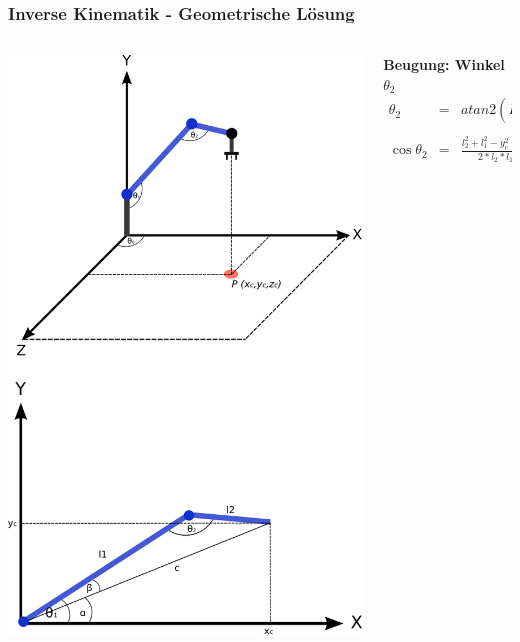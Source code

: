 \begin{frame}
\frametitle{Inverse Kinematik - Geometrische Lösung}
\begin{columns}
\begin{column}{.32\textwidth}
\includegraphics[scale=0.2]{imgs/inverseKinematik.png}
\end{column}%
\hfill
\begin{column}{.72\textwidth}
\textbf{Beugung: Winkel $\theta_2$}
\small \begin{eqnarray*}
\theta_2 &=& atan2(D, \pm \sqrt{1-D^2}) \\ \\
\cos \theta_2 &=& \frac{l_2^2 + l_1^2 - y_c^2 - z_c^2}{2*l_2*l_1} :=D
\end{eqnarray*}
\end{column}
\end{columns}
\end{frame}


